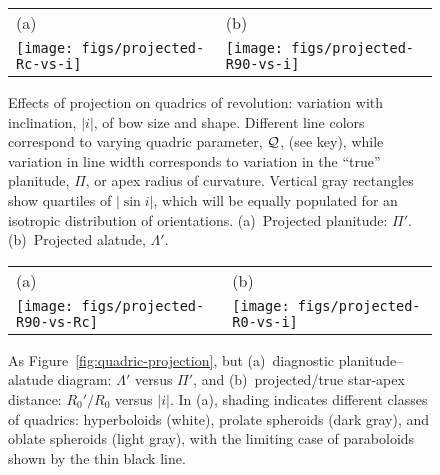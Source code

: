 \documentclass[useAMS, usenatbib, a4paper]{mnras}
\providecommand{\abs}[1]{\lvert#1\rvert}
\begin{document}
\begin{figure*}
  \centering
  \begin{tabular}{@{}ll@{}}
    (a) & (b) \\
    \texttt{[image: figs/projected-Rc-vs-i]}
        & \texttt{[image: figs/projected-R90-vs-i]}
  \end{tabular}
  \caption[]{Effects of projection on quadrics of revolution:
    variation with inclination, \(\abs{i}\), of bow size and shape.
    Different line colors correspond to varying quadric parameter,
    \(\mathcal{Q}\), (see key), while variation in line width corresponds to
    variation in the ``true'' planitude, \(\Pi\), or apex radius of
    curvature. Vertical gray rectangles show quartiles of
    \(\abs{\sin i}\), which will be equally populated for an isotropic
    distribution of orientations. (a)~Projected planitude:
    \(\Pi'\). (b)~Projected alatude, \(\Lambda'\).}
  \label{fig:quadric-projection}
  \bigskip
  \bigskip
  \begin{tabular}{@{}ll@{}}
    (a) & (b) \\
    \texttt{[image: figs/projected-R90-vs-Rc]}
    & \texttt{[image: figs/projected-R0-vs-i]}
  \end{tabular}
  \caption[]{ As Figure~\ref{fig:quadric-projection}, but %
    (a)~diagnostic planitude--alatude diagram: \(\Lambda'\) versus
    \(\Pi'\), and %
    (b)~projected/true star-apex distance: \(R_0' / R_0\) versus
    \(\abs{i}\). %
    In (a), shading indicates different classes of quadrics:
    hyperboloids (white), prolate spheroids (dark gray), and oblate
    spheroids (light gray), with the limiting case of paraboloids
    shown by the thin black line.}
  \label{fig:quadric-projection-continued}
\end{figure*}
\end{document}
